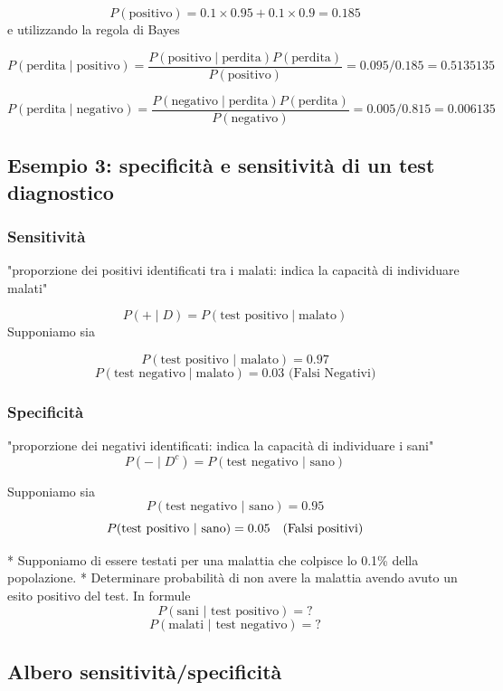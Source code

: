 \documentclass[onecolumn,12pt]{book}\usepackage[]{graphicx}\usepackage[]{color}
\begin{document}
$$P(\textrm{positivo})=0.1\times 0.95+0.1\times 0.9=0.185$$
e utilizzando la regola di Bayes

$$P(\textrm{perdita}\mid \textrm{positivo})=\dfrac{P(\textrm{positivo}\mid \textrm{perdita})P(\textrm{perdita})}{P(\textrm{positivo})}=0.095/0.185=0.5135135$$


$$P(\textrm{perdita}\mid \textrm{negativo})=\dfrac{P(\textrm{negativo}\mid \textrm{perdita})P(\textrm{perdita})}{P(\textrm{negativo})}=0.005/0.815=0.006135$$
\subsection{Esempio 3: specificità e sensitività di un test diagnostico }

\subsubsection{Sensitività }

"proporzione dei positivi identificati tra i malati: 
indica la capacità di individuare malati"


$$P(+ \mid D)=P(\textrm{test positivo}\mid \textrm{malato})$$
Supponiamo sia


$$P(\textrm{test positivo | malato}) = 0.97$$
$$P(\textrm{test negativo} \mid  \textrm{malato}) = 0.03 \textrm{ (Falsi Negativi)}$$

\subsubsection{Specificità }

"proporzione dei negativi identificati: indica la capacità di individuare i sani" 
$$P(-\mid D^c)= P(\textrm{test negativo | sano})$$

Supponiamo sia
$$P(\textrm{test negativo | sano}) = 0.95$$
$$P(\textrm{test positivo | sano}) = 0.05 \quad \hbox{(Falsi positivi)}$$

* Supponiamo di essere testati per una malattia che colpisce lo 0.1\%  della popolazione. 
* Determinare  probabilità  di non avere la malattia avendo avuto un esito positivo del test.
In formule 
$$P (\textrm{sani | test positivo}) = ?$$
$$P(\textrm{malati | test negativo})=?$$
 
\subsection{Albero sensitività/specificità}
\end{document}
